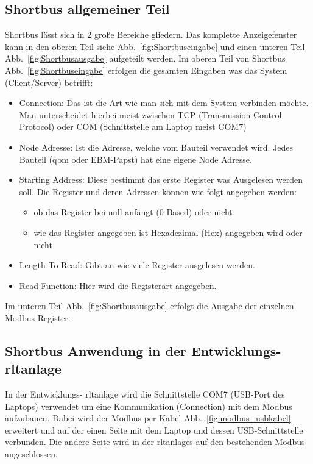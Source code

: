 \subsection{Shortbus allgemeiner Teil}
Shortbus lässt sich in 2 große Bereiche gliedern. Das komplette Anzeigefenster kann in den oberen Teil siehe Abb.~\ref{fig:Shortbuseingabe} und einen unteren Teil Abb.~\ref{fig:Shortbusausgabe} aufgeteilt werden.
Im oberen Teil von Shortbus Abb.~\ref{fig:Shortbuseingabe} erfolgen die gesamten Eingaben was das System (Client/Server) betrifft:
\begin{itemize}
	\item Connection: Das ist die Art wie man sich mit dem System verbinden möchte. Man unterscheidet hierbei meist zwischen TCP (Transmission Control Protocol) oder COM (Schnittstelle am Laptop meist COM7)
	
	\item Node Adresse: Ist die Adresse, welche vom Bauteil verwendet wird. Jedes Bauteil (\zB \gls{qbm}  oder EBM-Papst) hat eine eigene Node Adresse.
	
	\item Starting Address: Diese bestimmt das erste Register was Ausgelesen werden soll. Die Register und deren Adressen können wie folgt angegeben werden:
		\begin{itemize}
			\item ob das Register bei null anfängt (0-Based) oder nicht
			\item wie das Register angegeben ist Hexadezimal (Hex) angegeben wird oder nicht
		\end{itemize}
	\item Length To Read: Gibt an wie viele Register ausgelesen werden. 
	\item Read Function: Hier wird die Registerart angegeben.
\end{itemize}

Im unteren Teil Abb.~\ref{fig:Shortbusausgabe} erfolgt die Ausgabe der einzelnen Modbus Register.  


  

\subsection{Shortbus Anwendung in der Entwicklungs- \ac{rltanlage}}

In der Entwicklungs- \ac{rltanlage} wird die Schnittstelle COM7 (USB-Port des Laptops) verwendet um eine Kommunikation (Connection) mit dem Modbus aufzubauen. Dabei wird der Modbus per Kabel  Abb.~\ref{fig:modbus_usbkabel} erweitert und auf der einen Seite mit dem Laptop und dessen USB-Schnittstelle verbunden. Die andere Seite wird in der \acp{rltanlage} auf den bestehenden Modbus angeschlossen. 

